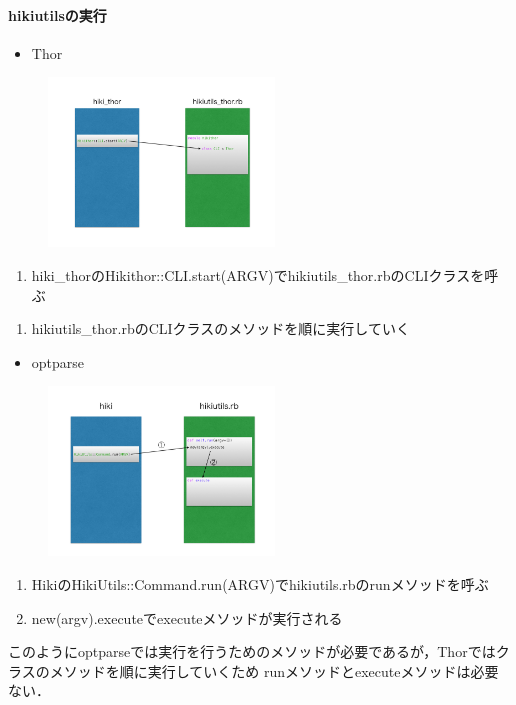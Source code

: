 \paragraph{hikiutilsの実行}
\begin{itemize}
\item Thor
\end{itemize}
\begin{figure}[htbp]\begin{center}
\includegraphics[width=6cm,bb=0 0 442 500]{../figs/./hikiutils_yamane.004.jpg}
\caption{}
\label{default}\end{center}\end{figure}
\begin{enumerate}
\item hiki\_thorのHikithor::CLI.start(ARGV)でhikiutils\_thor.rbのCLIクラスを呼ぶ
\end{enumerate}
\begin{enumerate}
\item hikiutils\_thor.rbのCLIクラスのメソッドを順に実行していく
\end{enumerate}
\begin{itemize}
\item optparse
\end{itemize}
\begin{figure}[htbp]\begin{center}
\includegraphics[width=6cm,bb=0 0 442 500]{../figs/./hikiutils_yamane.001.jpg}
\caption{}
\label{default}\end{center}\end{figure}
\begin{enumerate}
\item HikiのHikiUtils::Command.run(ARGV)でhikiutils.rbのrunメソッドを呼ぶ
\item new(argv).executeでexecuteメソッドが実行される
\end{enumerate}
このようにoptparseでは実行を行うためのメソッドが必要であるが，Thorではクラスのメソッドを順に実行していくため
runメソッドとexecuteメソッドは必要ない．

